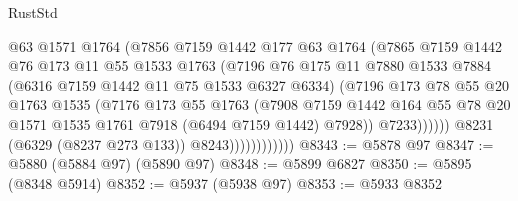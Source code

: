 \begin{lexlean}{RustStd}
\begin{coremodule}
{{                                @63
                                @1571
                                @1764
                                (@7856
                                  @7159
                                  @1442
                                  @177
                                  @63
                                  @1764
                                  (@7865
                                    @7159
                                    @1442
                                    @76
                                    @173
                                    @11
                                    @55
                                    @1533
                                    @1763
                                    (@7196
                                      @76
                                      @175
                                      @11
                                      @7880
                                      @1533
                                      @7884
                                      (@6316 @7159 @1442 @11 @75 @1533 @6327 @6334)
                                      (@7196
                                        @173
                                        @78
                                        @55
                                        @20
                                        @1763
                                        @1535
                                        (@7176
                                          @173
                                          @55
                                          @1763
                                          (@7908
                                            @7159
                                            @1442
                                            @164
                                            @55
                                            @78
                                            @20
                                            @1571
                                            @1535
                                            @1761
                                            @7918
                                            (@6494 @7159 @1442)
                                            @7928))
                                        @7233))))))
                            @8231
                            (@6329 (@8237 @273 @133))
                            @8243))))))))))))
@8343 := @5878 @97
@8347 := @5880 (@5884 @97) (@5890 @97)
@8348 := @5899 @6827
@8350 := @5895 (@8348 @5914)
@8352 := @5937 (@5938 @97)
@8353 := @5933 @8352
}}
\end{coremodule}
\end{lexlean}
